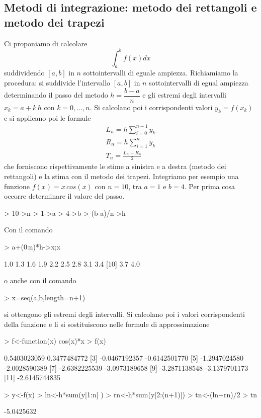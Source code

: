 \documentclass[onecolumn,11pt]{book}
\begin{document}
\subsection{Metodi di integrazione: metodo dei rettangoli e metodo dei trapezi}
Ci proponiamo di calcolare $$\int_a^b f(x)dx$$ suddividendo $[a,b]$ in $n$ sottointervalli di eguale ampiezza. Richiamiamo la procedura:  si suddivide l'intervallo $[a,b]$ in $n$ sottointervalli di egual ampiezza determinando il passo del metodo
$h=\dfrac{b-a}{n}$
e gli estremi degli intervalli 
$x_k=a+ k\, h$ con $k=0,\ldots,n$. Si calcolano poi i corrispondenti valori  $y_k=f(x_k)$ e si applicano poi le formule
\begin{eqnarray*}
L_n=h \sum_{i=0}^{n-1} y_k\\
R_n=h \sum_{i=1}^{n} y_k\\
T_n=\frac{L_n+R_n}{2}\end{eqnarray*}
che forniscono rispettivamente le stime a sinistra e a destra (metodo dei rettangoli) e la stima con il metodo dei trapezi.
Integriamo per esempio  una funzione $f(x)=x\, cos(x)$ con $n=10$, tra $a=1$ e $b=4$. Per prima cosa occorre determinare  il valore del passo.
\begin{Schunk}
\begin{Sinput}
> 10->n
> 1->a
> 4->b
> (b-a)/n->h
\end{Sinput}
\end{Schunk}
Con il comando   
\begin{Schunk}
\begin{Sinput}
> a+(0:n)*h->x;x
\end{Sinput}
\begin{Soutput}
 [1] 1.0 1.3 1.6 1.9 2.2 2.5 2.8 3.1 3.4
[10] 3.7 4.0
\end{Soutput}
\end{Schunk}
o anche con il comando
\begin{Schunk}
\begin{Sinput}
> x=seq(a,b,length=n+1)
\end{Sinput}
\end{Schunk}
si ottengono gli estremi degli intervalli. Si calcolano poi i valori corrispondenti della funzione e li si sostituiscono nelle formule di approssimazione
\begin{Schunk}
\begin{Sinput}
> f<-function(x) cos(x)*x
> f(x)
\end{Sinput}
\begin{Soutput}
 [1]  0.5403023059  0.3477484772
 [3] -0.0467192357 -0.6142501770
 [5] -1.2947024580 -2.0028590389
 [7] -2.6382225539 -3.0973189658
 [9] -3.2871138548 -3.1379701173
[11] -2.6145744835
\end{Soutput}
\begin{Sinput}
> y<-f(x)
> ln<-h*sum(y[1:n] )
> rn<-h*sum(y[2:(n+1)])
> tn<-(ln+rn)/2
> tn
\end{Sinput}
\begin{Soutput}
[1] -5.0425632
\end{Soutput}
\end{Schunk}
\end{document}
